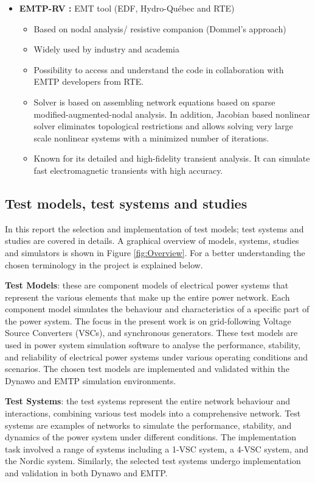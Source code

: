 \documentclass{report}
\begin{document}
\begin{itemize}
    \item \textbf{EMTP-RV \cite{EMTP}:}  EMT tool (EDF, Hydro-Québec and RTE)
    \begin{itemize}
        \item Based on nodal analysis/ resistive companion (Dommel's approach)
        \item Widely used by industry and academia
        \item Possibility to access and understand the code in collaboration with EMTP developers from RTE.
        \item Solver is based on assembling network equations based on sparse modified-augmented-nodal analysis. In addition, Jacobian based nonlinear solver eliminates topological restrictions and allows solving very large scale nonlinear systems with a minimized number of iterations.
        \item Known for its detailed and high-fidelity transient analysis. It can simulate fast electromagnetic transients with high accuracy.
    \end{itemize}
\end{itemize}

\subsection*{Test models, test systems and studies}
In this report the selection and implementation of test models; test systems and studies are covered in details. A graphical overview of models, systems, studies and simulators is shown in Figure \ref{fig:Overview}. For a better understanding the chosen terminology in the project is explained below.

\textbf{Test Models}: these are component models of electrical power systems that represent the various elements that make up the entire power network. Each component model simulates the behaviour and characteristics of a specific part of the power system. The focus in the present work is on grid-following Voltage Source Converters (VSCs), and synchronous generators. These test models are used in power system simulation software to analyse the performance, stability, and reliability of electrical power systems under various operating conditions and scenarios. The chosen test models are implemented and validated within the Dynawo and EMTP simulation environments.

\textbf{Test Systems}: the test systems represent the entire network behaviour and interactions, combining various test models into a comprehensive network. Test systems are examples of networks to simulate the performance, stability, and dynamics of the power system under different conditions. The implementation task involved a range of systems including a 1-VSC system, a 4-VSC system, and the Nordic system. Similarly, the selected test systems undergo implementation and validation in both Dynawo and EMTP.
\end{document}
